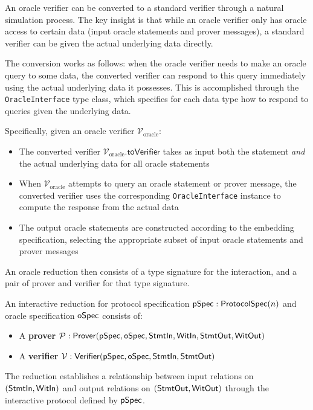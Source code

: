 \begin{definition}
    \label{def:oracle_verifier_to_verifier}
    An oracle verifier can be converted to a standard verifier through a natural simulation process. The key insight is that while an oracle verifier only has oracle access to certain data (input oracle statements and prover messages), a standard verifier can be given the actual underlying data directly.

    The conversion works as follows: when the oracle verifier needs to make an oracle query to some data, the converted verifier can respond to this query immediately using the actual underlying data it possesses. This is accomplished through the \texttt{OracleInterface} type class, which specifies for each data type how to respond to queries given the underlying data.

    Specifically, given an oracle verifier $\mathcal{V}_{\text{oracle}}$:
    \begin{itemize}
        \item The converted verifier $\mathcal{V}_{\text{oracle}}.\mathsf{toVerifier}$ takes as input both the statement \emph{and} the actual underlying data for all oracle statements
        \item When $\mathcal{V}_{\text{oracle}}$ attempts to query an oracle statement or prover message, the converted verifier uses the corresponding \texttt{OracleInterface} instance to compute the response from the actual data
        \item The output oracle statements are constructed according to the embedding specification, selecting the appropriate subset of input oracle statements and prover messages
    \end{itemize}
\end{definition}

An oracle reduction then consists of a type signature for the interaction, and a pair of prover and
verifier for that type signature.

\begin{definition}
    \label{def:interactive_reduction}
    An interactive reduction for protocol specification $\mathsf{pSpec} : \mathsf{ProtocolSpec}(n)$ and oracle specification $\mathsf{oSpec}$ consists of:
    \begin{itemize}
        \item A \textbf{prover} $\mathcal{P} : \mathsf{Prover}(\mathsf{pSpec}, \mathsf{oSpec}, \mathsf{StmtIn}, \mathsf{WitIn}, \mathsf{StmtOut}, \mathsf{WitOut})$
        \item A \textbf{verifier} $\mathcal{V} : \mathsf{Verifier}(\mathsf{pSpec}, \mathsf{oSpec}, \mathsf{StmtIn}, \mathsf{StmtOut})$
    \end{itemize}

    The reduction establishes a relationship between input relations on $(\mathsf{StmtIn}, \mathsf{WitIn})$ and output relations on $(\mathsf{StmtOut}, \mathsf{WitOut})$ through the interactive protocol defined by $\mathsf{pSpec}$.
\end{definition}

